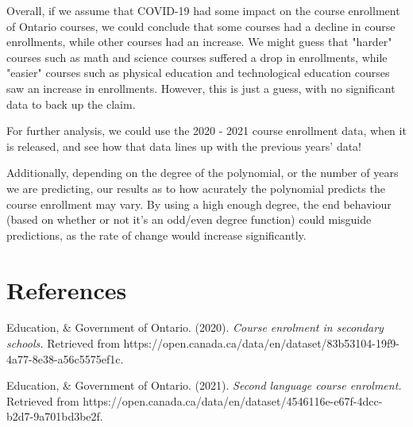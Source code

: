 \documentclass[fontsize=11pt]{article}
\begin{document}
Overall, if we assume that COVID-19 had some impact on the course enrollment of Ontario courses,
we could conclude that some courses had a decline in course enrollments, while other courses had an increase.
We might guess that "harder" courses such as math and science courses suffered a drop in enrollments, while
"easier" courses such as physical education and technological education courses saw an increase in enrollments.
However, this is just a guess, with no significant data to back up the claim.

For further analysis, we could use the 2020 - 2021 course enrollment data, when it is released,
and see how that data lines up with the previous years' data!

Additionally, depending on the degree of the polynomial, or the number of years we are predicting,
our results as to how acurately the polynomial predicts the course enrollment may vary.
By using a high enough degree, the end behaviour (based on whether or not it's an odd/even degree function)
could misguide predictions, as the rate of change would increase significantly.

\section*{References}

\noindent Education, \& Government of Ontario. (2020). \emph{Course enrolment in secondary schools.} Retrieved from \linebreak \indent https://open.canada.ca/data/en/dataset/83b53104-19f9-4a77-8e38-a56c5575ef1c.

\noindent Education, \& Government of Ontario. (2021). \emph{Second language course enrolment.} Retrieved from \linebreak \indent https://open.canada.ca/data/en/dataset/4546116e-e67f-4dcc-b2d7-9a701bd3be2f. 

\end{document}
